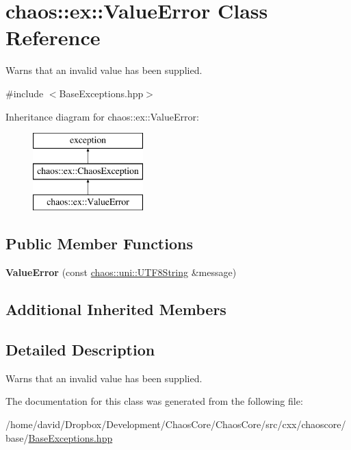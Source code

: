 \hypertarget{classchaos_1_1ex_1_1_value_error}{\section{chaos\-:\-:ex\-:\-:Value\-Error Class Reference}
\label{classchaos_1_1ex_1_1_value_error}
}


Warns that an invalid value has been supplied.  




{\ttfamily \#include $<$Base\-Exceptions.\-hpp$>$}

Inheritance diagram for chaos\-:\-:ex\-:\-:Value\-Error\-:\begin{figure}[H]
\begin{center}
\leavevmode
\includegraphics[height=3.000000cm]{classchaos_1_1ex_1_1_value_error}
\end{center}
\end{figure}
\subsection*{Public Member Functions}
\begin{DoxyCompactItemize}
\item 
\hypertarget{classchaos_1_1ex_1_1_value_error_a2e38ae92cef2be7b6e7babd4d33d3239}{{\bfseries Value\-Error} (const \hyperlink{classchaos_1_1uni_1_1_u_t_f8_string}{chaos\-::uni\-::\-U\-T\-F8\-String} \&message)}\label{classchaos_1_1ex_1_1_value_error_a2e38ae92cef2be7b6e7babd4d33d3239}

\end{DoxyCompactItemize}
\subsection*{Additional Inherited Members}


\subsection{Detailed Description}
Warns that an invalid value has been supplied. 

The documentation for this class was generated from the following file\-:\begin{DoxyCompactItemize}
\item 
/home/david/\-Dropbox/\-Development/\-Chaos\-Core/\-Chaos\-Core/src/cxx/chaoscore/base/\hyperlink{_base_exceptions_8hpp}{Base\-Exceptions.\-hpp}\end{DoxyCompactItemize}
